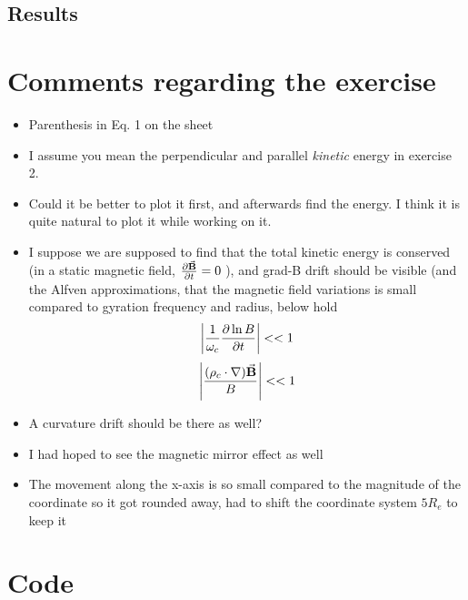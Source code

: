 \documentclass[x11names]{article}
\begin{document}
\subsection{Results}

      

\appendix
\section{Comments regarding the exercise}
      \begin{itemize}
            \item Parenthesis in Eq. 1 on the sheet
            \item I assume you mean the perpendicular and parallel \textit{kinetic} energy in exercise 2.
            \item Could it be better to plot it first, and afterwards find the energy. I think it is quite natural to plot it while working on it.
            \item I suppose we are supposed to find that the total kinetic energy is conserved (in a static magnetic field, \(\pdv{\va{B}}{t} = 0\) ), and grad-B drift should be visible (and the Alfven approximations, that the magnetic field variations is small compared to gyration frequency and radius, below hold
            \[ \left|\frac{1}{\omega_c} \pdv{\ln{B}}{t}\right| << 1 \] 
            \[ \left| \frac{(\rho_c \cdot \nabla)\va{B}}{B} \right| << 1 \] 
            \item A curvature drift should be there as well?
            \item I had hoped to see the magnetic mirror effect as well
            \item The movement along the x-axis is so small compared to the magnitude of the coordinate so it got rounded away, had to shift the coordinate system \(5R_e\) to keep it
      \end{itemize}


\section{Code}
      
\end{document}
